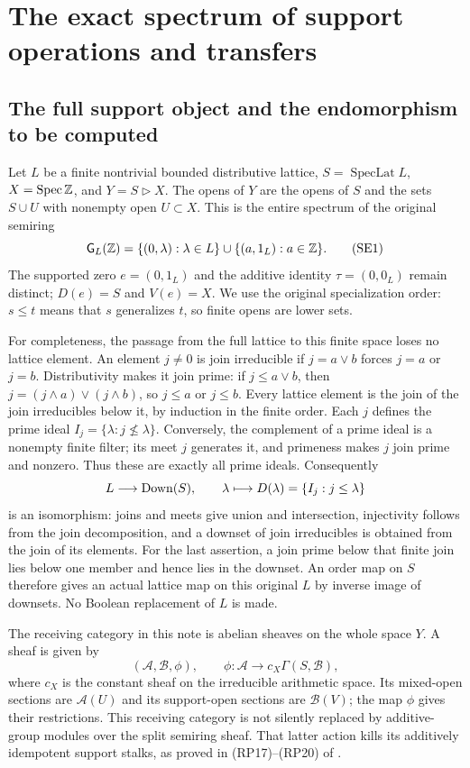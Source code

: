 \section{The exact spectrum of support operations and transfers}


\subsection{The full support object and the endomorphism to be computed}

Let $L$ be a finite nontrivial bounded distributive lattice,
$S=\operatorname{SpecLat}L$, $X=\operatorname{Spec}\mathbb Z$, and
$Y=S\triangleright X$. The opens of $Y$ are the opens of $S$ and
the sets $S\cup U$ with nonempty open $U\subset X$. This is the
entire spectrum of the original semiring
\[
 \mathsf G_L(\mathbb Z)=\{(0,\lambda):\lambda\in L\}
       \cup\{(a,1_L):a\in\mathbb Z\}.
 \tag{SE1}\label{eq:original-space}
\]
The supported zero $e=(0,1_L)$ and the additive identity
$\tau=(0,0_L)$ remain distinct; $D(e)=S$ and $V(e)=X$.
We use the original specialization order: $s\le t$ means that $s$
generalizes $t$, so finite opens are lower sets.

For completeness, the passage from the full lattice to this finite
space loses no lattice element. An element $j\ne0$ is join
irreducible if $j=a\vee b$ forces $j=a$ or $j=b$. Distributivity
makes it join prime: if $j\le a\vee b$, then
$j=(j\wedge a)\vee(j\wedge b)$, so $j\le a$ or $j\le b$.
Every lattice element is the join of the join irreducibles below
it, by induction in the finite order. Each $j$ defines the prime
ideal $I_j=\{\lambda:j\not\le\lambda\}$. Conversely, the complement
of a prime ideal is a nonempty finite filter; its meet $j$ generates
it, and primeness makes $j$ join prime and nonzero. Thus these are
exactly all prime ideals. Consequently
\[
 L\longrightarrow\operatorname{Down}(S),\qquad
 \lambda\longmapsto D(\lambda)=\{I_j:j\le\lambda\}
\]
is an isomorphism: joins and meets give union and intersection,
injectivity follows from the join decomposition, and a downset of
join irreducibles is obtained from the join of its elements.
For the last assertion, a join prime below that finite join lies
below one member and hence lies in the downset. An order map on
$S$ therefore gives an actual lattice map on this original $L$
by inverse image of downsets. No Boolean replacement of $L$ is made.

The receiving category in this note is abelian sheaves on the whole
space $Y$. A sheaf is given by
\[
 (\mathcal A,\mathcal B,\phi),\qquad
 \phi:\mathcal A\longrightarrow c_X\Gamma(S,\mathcal B),
 \tag{SE2}\label{eq:gluing}
\]
where $c_X$ is the constant sheaf on the irreducible arithmetic space.
Its mixed-open sections are $\mathcal A(U)$ and its support-open
sections are $\mathcal B(V)$; the map $\phi$ gives their restrictions.
This receiving category is not silently replaced by additive-group
modules over the split semiring sheaf. That latter action kills its
additively idempotent support stalks, as proved in (RP17)--(RP20) of
.

